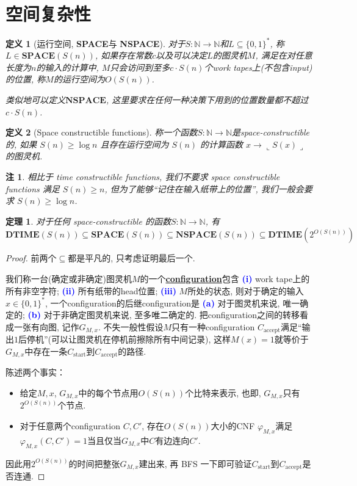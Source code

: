 \documentclass[8pt]{article}
\theoremstyle{compact}
\newtheorem{theorem}{定理}[section]
\newtheorem{definition}{定义}[section]
\newtheorem{remark}{注}[section]
\def\obj#1{\textbf{\uline{#1}}}
\def\num#1{\textnormal{\textbf{\mbox{\textcolor{blue}{(#1)}}}}}
\def\ge{\geqslant}
\def\rep#1{\llcorner{#1}\lrcorner}
\def\DTIME{\textbf{DTIME}}
\def\SPACE{\textbf{SPACE}}
\def\NSPACE{\textbf{NSPACE}}
\begin{document}
\section{空间复杂性}
\begin{definition}[运行空间, \SPACE 与 \NSPACE]
	对于$S: \mathbb N \to \mathbb N$和$L \subseteq \{0, 1\}^*$, 称$L \in \SPACE(S(n))$, 如果存在常数$c$以及可以决定$L$的图灵机$M$, 满足在对任意长度为$n$的输入的计算中, $M$只会访问到至多$c \cdot S(n)$个work tapes上(不包含input)的位置, 称$M$的运行空间为$O(S(n))$. 

	类似地可以定义$\NSPACE$, 这里要求在任何一种决策下用到的位置数量都不超过$c \cdot S(n)$. 
\end{definition}
\begin{definition}[Space constructible functions]
	称一个函数$S: \mathbb N \to \mathbb N$是space-constructible的, 如果 $S(n) \ge \log n$ 且存在运行空间为 $S(n)$ 的计算函数 $x \to \rep{S(x)}$ 的图灵机.
\end{definition}
\begin{remark}
	相比于 time constructible functions, 我们不要求 space constructible functions 满足 $S(n) \ge n$, 但为了能够“记住在输入纸带上的位置”, 我们一般会要求 $S(n) \ge \log n$. 
\end{remark}
\begin{theorem}
	对于任何 space-constructible 的函数$S: \mathbb N \to \mathbb N$, 有
	$$\DTIME(S(n)) \subseteq \SPACE(S(n)) \subseteq \NSPACE(S(n)) \subseteq \DTIME(2^{O(S(n))})$$
	\label{time_and_space}
\end{theorem}
\begin{proof}
	前两个$\subseteq$都是平凡的, 只考虑证明最后一个. 

	我们称一台(确定或非确定)图灵机$M$的一个\obj{configuration}包含 \num{i} work tape上的所有非空字符; \num{ii} 所有纸带的head位置; \num{iii} $M$所处的状态, 则对于确定的输入$x \in \{0, 1\}^*$, 一个configuration的后继configuration是 \num{a} 对于图灵机来说, 唯一确定的; \num{b} 对于非确定图灵机来说, 至多唯二确定的. 把configuration之间的转移看成一张有向图, 记作$G_{M, x}$. 不失一般性假设$M$只有一种configuration $C_{\text{accept}}$满足“输出$1$后停机”(可以让图灵机在停机前擦除所有中间记录), 这样$M(x) = 1$就等价于$G_{M, x}$中存在一条$C_{\text{start}}$到$C_{\text{accept}}$的路径. 

	陈述两个事实：
	\begin{itemize}
		\item 给定$M, x$, $G_{M, x}$中的每个节点用$O(S(n))$个比特来表示, 也即, $G_{M, x}$只有$2^{O(S(n))}$个节点. 
		\item 对于任意两个configuration $C, C'$, 存在$O(S(n))$大小的CNF $\varphi_{M, x}$满足$\varphi_{M, x}(C, C') = 1$当且仅当$G_{M, x}$中$C$有边连向$C'$. 
	\end{itemize}

	因此用$2^{O(S(n))}$的时间把整张$G_{M, x}$建出来, 再 BFS 一下即可验证$C_{\text{start}}$到$C_{\text{accept}}$是否连通. 
\end{proof}
\end{document}
